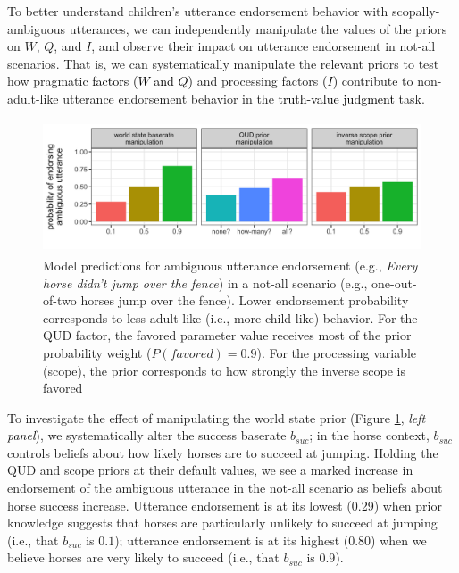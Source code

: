 \documentclass[cm]{glossa}
\newcommand{\lp}[1]{\textcolor{black}{#1}} %
\begin{document}
To better understand children's utterance endorsement behavior with scopally-ambiguous utterances, we can independently manipulate the values of the priors on $W$, $Q$, and $I$, and observe their impact on utterance endorsement in not-all scenarios. That is, we can systematically manipulate the relevant priors to test how pragmatic 
\lp{factors ($W$ and $Q$)} and processing factors 
\lp{($I$)}
contribute to non-adult-like utterance endorsement behavior in the 
\lp{truth-value judgment}
task.


\begin{figure}[t]
\centering
\includegraphics[height=1.55in]{every-not-plot.png}
\caption{Model predictions for ambiguous utterance endorsement (e.g., \emph{Every horse didn't jump over the fence}) in a not-all scenario (e.g., one-out-of-two horses jump over the fence). Lower endorsement probability corresponds to less adult-like (i.e., more child-like) behavior. For the QUD factor, the favored parameter value receives most of the prior probability weight ($P(favored) = 0.9$). For the processing variable (scope), the prior corresponds to how strongly the inverse scope is favored}
\label{fig:every-not-plot}
\end{figure}


To investigate the effect of manipulating the world state prior (Figure \ref{fig:every-not-plot}, \emph{left \lp{panel}}), we systematically alter the success baserate $b_{suc}$; in the horse context, $b_{suc}$ controls beliefs about how likely
horses are to succeed at jumping. Holding the QUD and scope priors at their default values, we see a marked increase in endorsement of the ambiguous utterance in the not-all scenario as beliefs about horse success increase. Utterance endorsement is at its lowest (0.29) when prior knowledge suggests that horses are particularly unlikely to succeed at jumping (i.e., that $b_{suc}$ is $0.1$); utterance endorsement is at its highest (0.80) when we believe horses are very likely to succeed (i.e., that $b_{suc}$ is $0.9$).
\end{document}

